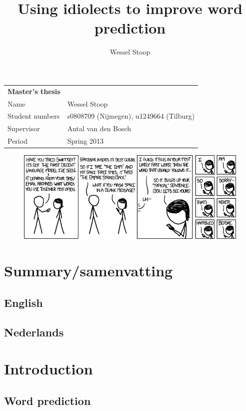 \documentclass[12pt]{article}
\title{Using idiolects to improve word prediction}
\author{Wessel Stoop}
\let\stdsection\section
\renewcommand\section{\newpage\stdsection}
\begin{document}
\begin{table}[b]
\begin{tabular}{ll}
\textbf{Master's thesis}&\\
Name&Wessel Stoop\\
Student numbers&s0808709 (Nijmegen), u1249664 (Tilburg)\\
Supervisor&Antal van den Bosch\\
Period&Spring 2013\\
\end{tabular}
\end{table}

\maketitle

\begin{figure}
\includegraphics[scale=0.5]{swiftkey}
\end{figure}

\clearpage

\tableofcontents

\section{Summary/samenvatting}

\subsection{English}

\subsection{Nederlands}

\section{Introduction} \label{intro}

\subsection{Word prediction}
\end{document}

